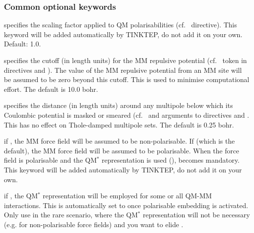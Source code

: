 \documentclass[letterpaper,10pt,english]{sphinxmanual}
\begin{document}
\subsubsection{Common optional keywords}
\label{\detokenize{tinktep:common-optional-keywords}}
 \textendash{} specifies the scaling factor applied to QM
polarisabilities (cf.   directive).
This keyword will be added automatically by TINKTEP, do not add it on
your own. Default: 1.0.

 \textendash{} specifies the cutoff
(in length units) for the MM repulsive potential (cf.  token in
 directives  and
). The value of the MM repulsive potential
from an MM site will be assumed to be zero beyond this cutoff. This is
used to minimise computational effort. The default is 10.0 bohr.

 \textendash{} specifies the distance
(in length units) around any multipole below which its Coulombic
potential is masked or smeared (cf.  and
 arguments to 
directives  and . This
has no effect on Thole-damped multipole sets. The default is 0.25 bohr.

 \textendash{} if , the MM force field will
be assumed to be non-polarisable. If  (which is the default), the
MM force field will be assumed to be polarisable. When the force field
is polarisable and the QM\(^*\) representation is used
(),  becomes
mandatory. This keyword will be added automatically by TINKTEP, do not
add it on your own.

 \textendash{} if , the QM\(^*\)
representation will be employed for some or all QM-MM interactions. This
is automatically set to  once polarisable embedding is activated.
Only use  in the rare scenario, where the QM\(^*\)
representation will not be necessary (e.g. for non-polarisable force
fields) and you want to elide .
\end{document}
